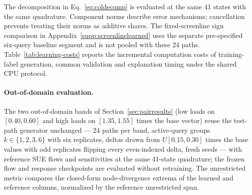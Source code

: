 The decomposition in Eq.~\eqref{eq:coldecomp} is evaluated at the same 41 states
with the same quadrature. Component norms describe error mechanisms; cancellation
prevents treating their norms as additive shares. The fixed-screenline sign
comparison in Appendix~\ref{supp:screenlinelearned} uses the separate
pre-specified six-query baseline segment and is not pooled with these 24 paths.
Table~\ref{tab:learning-costs} reports the incremental computation
costs of training-label generation, common validation and explanation
timing under the shared CPU protocol.


\paragraph{Out-of-domain evaluation.}
The two out-of-domain bands of Section~\ref{sec:pairresults}
(low loads on $[0.40,0.60]$ and high loads on $[1.35,1.55]$ times the
base vector) reuse the test-path generator unchanged --- 24 paths per
band, active-query groups $k\in\{1,2,3,6\}$ with six replicates,
deltas drawn from $U[0.15,0.30]$ times the base values with odd
replicates flipping every even-indexed delta, fresh seeds --- with
reference SUE flows and sensitivities at the same $41$-state
quadrature; the frozen flow and response checkpoints are evaluated
without retraining. The unrestricted metric compares the closed-form
node-divergence extrema of the learned and reference columns,
normalized by the reference unrestricted span.
